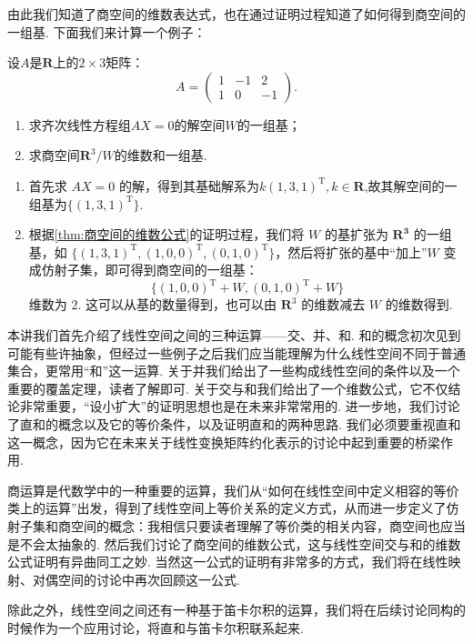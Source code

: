 由此我们知道了商空间的维数表达式，也在通过证明过程知道了如何得到商空间的一组基. 下面我们来计算一个例子：

\begin{example}{}{}
    设$A$是$\mathbf{R}$上的$2\times 3$矩阵：
    \[A=\begin{pmatrix}
            1 & -1 & 2 \\ 1 & 0 & -1
        \end{pmatrix}.\]
    \begin{enumerate}
        \item 求齐次线性方程组$AX=0$的解空间$W$的一组基；

        \item 求商空间$\mathbf{R}^3/W$的维数和一组基.
    \end{enumerate}
\end{example}

\begin{solution}
    \begin{enumerate}
        \item 首先求 $AX=0$ 的解，得到其基础解系为$k(1,3,1)^{\mathrm{T}},k \in \mathbf{R}$,故其解空间的一组基为$\{(1,3,1)^{\mathrm{T}}\}$.
        \item 根据\autoref{thm:商空间的维数公式}的证明过程，我们将 $W$ 的基扩张为 $\mathbf{R^3}$ 的一组基，如 $\{(1,3,1)^{\mathrm{T}},(1,0,0)^{\mathrm{T}},(0,1,0)^{\mathrm{T}}\}$，然后将扩张的基中``加上''$W$ 变成仿射子集，即可得到商空间的一组基：
        \[
            \{(1,0,0)^{\mathrm{T}}+W,(0,1,0)^{\mathrm{T}}+W\}
        \]
        维数为 $2$. 这可以从基的数量得到，也可以由 $\mathbf{R}^3$ 的维数减去 $W$ 的维数得到.

    \end{enumerate}
\end{solution}

\begin{summary}

    本讲我们首先介绍了线性空间之间的三种运算——交、并、和. 和的概念初次见到可能有些许抽象，但经过一些例子之后我们应当能理解为什么线性空间不同于普通集合，更常用``和''这一运算. 关于并我们给出了一些构成线性空间的条件以及一个重要的覆盖定理，读者了解即可. 关于交与和我们给出了一个维数公式，它不仅结论非常重要，``设小扩大''的证明思想也是在未来非常常用的. 进一步地，我们讨论了直和的概念以及它的等价条件，以及证明直和的两种思路. 我们必须要重视直和这一概念，因为它在未来关于线性变换矩阵约化表示的讨论中起到重要的桥梁作用.

    商运算是代数学中的一种重要的运算，我们从``如何在线性空间中定义相容的等价类上的运算''出发，得到了线性空间上等价关系的定义方式，从而进一步定义了仿射子集和商空间的概念：我相信只要读者理解了等价类的相关内容，商空间也应当是不会太抽象的. 然后我们讨论了商空间的维数公式，这与线性空间交与和的维数公式证明有异曲同工之妙. 当然这一公式的证明有非常多的方式，我们将在线性映射、对偶空间的讨论中再次回顾这一公式.

    除此之外，线性空间之间还有一种基于笛卡尔积的运算，我们将在后续讨论同构的时候作为一个应用讨论，将直和与笛卡尔积联系起来.

\end{summary}


